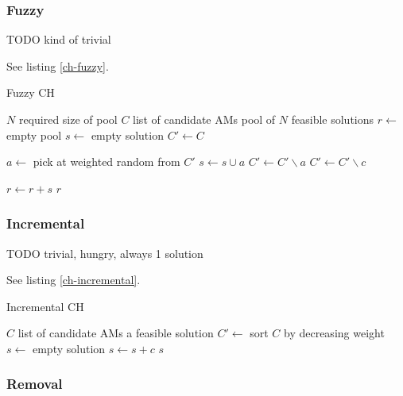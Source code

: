 \documentclass[a4paper,12pt,oneside]{report}
\begin{document}
\subsubsection{Fuzzy}

TODO kind of trivial

See listing \ref{ch-fuzzy}.

\begin{algorithm}
\caption{Fuzzy CH}
\label{ch-fuzzy}
\begin{algorithmic}
\REQUIRE $N$ required size of pool
\REQUIRE $C$ list of candidate AMs
\ENSURE pool of $N$ feasible solutions
\STATE $r \gets $ empty pool
  \STATE {}
  \STATE $s \gets $ empty solution
  \STATE $C' \gets C$

    \STATE $a \gets $ pick at weighted random from $C'$
      \STATE $s \gets s \cup a$
      \STATE $C' \gets C' \backslash a$
    \ENDIF
        \STATE {}
        \STATE $C' \gets C' \backslash c$
      \ENDIF
    \ENDFOR
  \ENDWHILE

  \STATE $r \gets r + s$
\ENDFOR
\RETURN $r$
\end{algorithmic}
\end{algorithm}

\subsubsection{Incremental}

TODO trivial, hungry, always 1 solution

See listing \ref{ch-incremental}.

\begin{algorithm}
\caption{Incremental CH}
\label{ch-incremental}
\begin{algorithmic}
\REQUIRE $C$ list of candidate AMs
\ENSURE a feasible solution
\STATE $C' \gets $ sort $C$ by decreasing weight
\STATE $s \gets $ empty solution
    \STATE $s \gets s + c$
  \ENDIF
\ENDFOR
\RETURN $s$
\end{algorithmic}
\end{algorithm}

\subsubsection{Removal}
\end{document}
